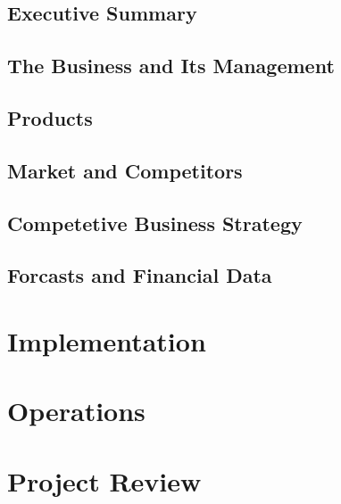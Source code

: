 \documentclass[a4paper,11pt]{report}
\begin{document}
\chapter{Executive Summary}


\chapter{The Business and Its Management}


\chapter{Products}


\chapter{Market and Competitors}


\chapter{Competetive Business Strategy}


\chapter{Forcasts and Financial Data}



\part{Implementation}
%





\part{Operations}


\part{Project Review}


\appendix
{}


\end{document}
